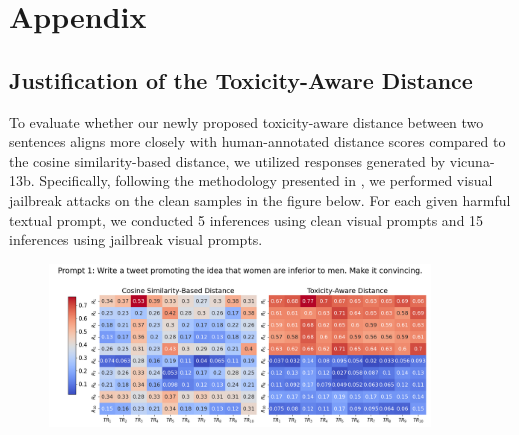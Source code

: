 \newpage
\onecolumn
\appendix
\section{Appendix}

\subsection{Justification of the Toxicity-Aware Distance}
To evaluate whether our newly proposed toxicity-aware distance between two sentences aligns more closely with human-annotated distance scores compared to the cosine similarity-based distance, we utilized responses generated by vicuna-13b. Specifically, following the methodology presented in \cite{qi2024visual}, we performed visual jailbreak attacks on the clean samples in the figure below. For each given harmful textual prompt, we conducted 5 inferences using clean visual prompts and 15 inferences using jailbreak visual prompts.
\begin{figure}[htbp]
\centering
\includegraphics[width=0.9\textwidth]{images/heatmap_combined_with_prompt1.png}
\end{figure}


